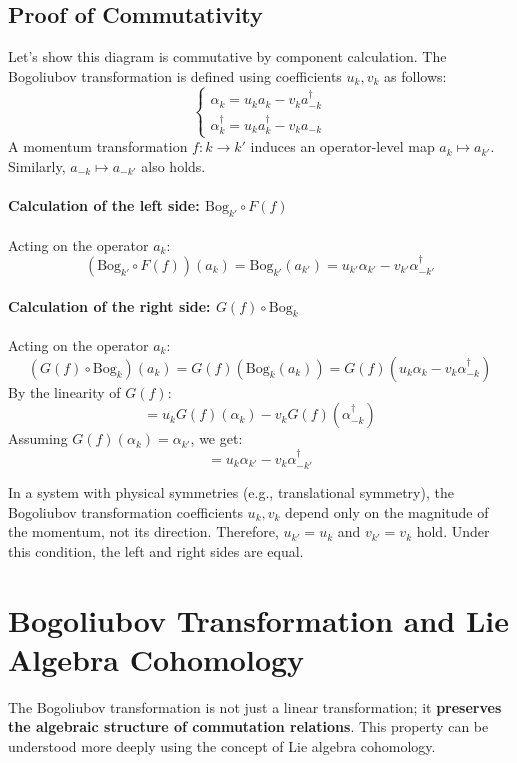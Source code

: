 \documentclass[uplatex,a4j,12pt,dvipdfmx]{article}
\begin{document}
\subsection{Proof of Commutativity}

Let's show this diagram is commutative by component calculation.
The Bogoliubov transformation is defined using coefficients $u_{k}, v_{k}$ as follows:
\[
    \begin{cases}
        \alpha_{k} = u_{k} a_{k} - v_{k} a_{-k}^{\dagger} \\
        \alpha_{k}^{\dagger} = u_{k} a_{k}^{\dagger} - v_{k} a_{-k}
    \end{cases}
\]
A momentum transformation $f: k \to k'$ induces an operator-level map $a_{k} \mapsto a_{k'}$. Similarly, $a_{-k} \mapsto a_{-k'}$ also holds.

\paragraph{Calculation of the left side: $\text{Bog}_{k'} \circ F(f)$}
Acting on the operator $a_{k}$:
\[
    (\text{Bog}_{k'} \circ F(f))(a_{k}) = \text{Bog}_{k'}(a_{k'}) = u_{k'} \alpha_{k'} - v_{k'} \alpha_{-k'}^{\dagger}
\]

\paragraph{Calculation of the right side: $G(f) \circ \text{Bog}_{k}$}
Acting on the operator $a_{k}$:
\[
    (G(f) \circ \text{Bog}_{k})(a_{k}) = G(f)(\text{Bog}_{k}(a_{k})) = G(f)(u_{k} \alpha_{k} - v_{k} \alpha_{-k}^{\dagger})
\]
By the linearity of $G(f)$:
\[
    = u_{k} G(f)(\alpha_{k}) - v_{k} G(f)(\alpha_{-k}^{\dagger})
\]
Assuming $G(f)(\alpha_{k}) = \alpha_{k'}$, we get:
\[
    = u_{k} \alpha_{k'} - v_{k} \alpha_{-k'}^{\dagger}
\]

In a system with physical symmetries (e.g., translational symmetry), the Bogoliubov transformation coefficients $u_{k}, v_{k}$ depend only on the magnitude of the momentum, not its direction. Therefore, $u_{k'} = u_{k}$ and $v_{k'} = v_{k}$ hold. Under this condition, the left and right sides are equal.

\section{Bogoliubov Transformation and Lie Algebra Cohomology}

The Bogoliubov transformation is not just a linear transformation; it \textbf{preserves the algebraic structure of commutation relations}. This property can be understood more deeply using the concept of Lie algebra cohomology.
\end{document}
